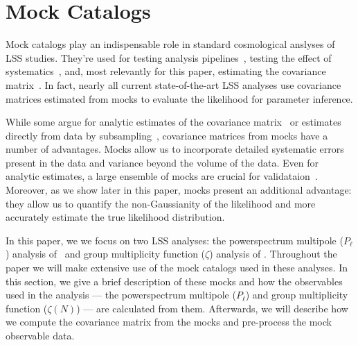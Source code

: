 \documentclass[12pt, letterpaper, preprint]{aastex}
\newcommand{\Beut}{\citetalias{beutler2017}}
\newcommand{\Sinh}{\citetalias{sinha2017a}}
\begin{document}
\section{Mock Catalogs}
Mock catalogs play an indispensable role in standard cosmological 
anslyses of LSS studies. They're used for testing analysis 
pipelines~\citep[][]{beutler2017, grieb2017, tinkerinpreparation}, 
testing the effect of systematics~\citep{guo2012, vargas-magana2014, hahn2017, pinol2017, ross2017}, 
and, most relevantly for this paper, estimating the covariance 
matrix~\citep[][]{parkinson2012, kazin2014, grieb2017, alam2017, beutler2017, sinha2017a}. 
In fact, nearly all current state-of-the-art LSS analyses use
covariance matrices estimated from mocks to evaluate the likelihood 
for parameter inference. 

While some argue for analytic estimates of the covariance 
matrix~\citep[e.g.][]{mohammed2017} or estimates directly from data
by subsampling~\citep[e.g.][]{norberg2009}, covariance matrices 
from mocks have a number of advantages. Mocks allow us 
to incorporate detailed systematic errors present in the 
data and variance beyond the volume of the data. Even for analytic 
estimates, a large ensemble of mocks are crucial for validataion~\citep[\emph{e.g.}][]{slepian2017}. 
Moreover, as we show later in this paper, mocks present an
additional advantage: they allow us to 
quantify the non-Gaussianity of the likelihood and more accurately 
estimate the true likelihood distribution. 

In this paper, we we focus on two LSS analyses: the powerspectrum 
multipole ($P_\ell$) analysis of \Beut~and group multiplicity 
function ($\zeta$) analysis of \Sinh. Throughout the paper we will 
make extensive use of the mock catalogs used in these analyses. 
In this section, we give a brief description of these mocks and how 
the observables used in the analysis --- the powerspectrum 
multipole ($P_\ell$) and group multiplicity function ($\zeta(N)$) ---
are calculated from them. Afterwards, we will describe how we compute 
the covariance matrix from the mocks and pre-process the mock observable
data.
\end{document}
